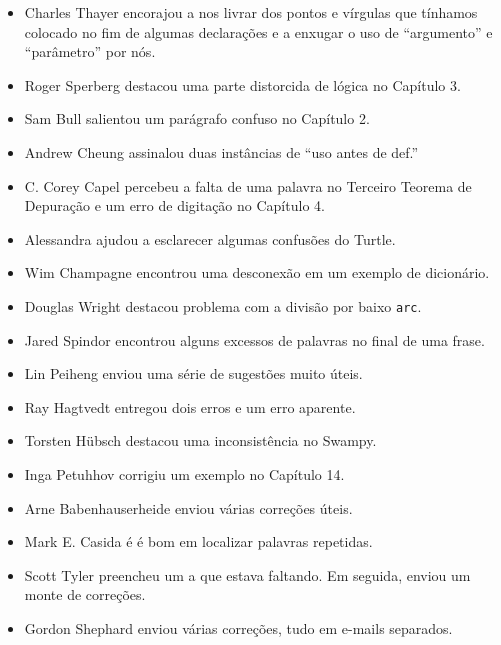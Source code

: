 \documentclass[10pt]{book}
\begin{document}
\begin {itemize}
\item Charles Thayer encorajou a nos livrar dos pontos e vírgulas
que tínhamos colocado no fim de algumas declarações e a enxugar o
uso de ``argumento'' e ``parâmetro'' por nós.

\item Roger Sperberg destacou uma parte distorcida de lógica no Capítulo 3.

\item Sam Bull salientou um parágrafo confuso no Capítulo 2.

\item Andrew Cheung assinalou duas instâncias de ``uso antes de def.''

\item C. Corey Capel percebeu a falta de uma palavra no Terceiro Teorema
de Depuração e um erro de digitação no Capítulo 4.

\item Alessandra ajudou a esclarecer algumas confusões do Turtle.

\item Wim Champagne encontrou uma desconexão em um exemplo de dicionário.

\item Douglas Wright destacou problema com a divisão por baixo
{\tt arc}.

\item Jared Spindor encontrou alguns excessos de palavras no final de uma frase.

\item Lin Peiheng enviou uma série de sugestões muito úteis.

\item Ray Hagtvedt entregou dois erros e um erro aparente.

\item Torsten H\"{u}bsch destacou uma inconsistência no Swampy.

\item Inga Petuhhov corrigiu um exemplo no Capítulo 14.

\item Arne Babenhauserheide enviou várias correções úteis.

\item Mark E. Casida é é bom em localizar palavras repetidas.

\item Scott Tyler preencheu um a que estava faltando. Em seguida, enviou
um monte de correções.

\item Gordon Shephard enviou várias correções, tudo em e-mails
separados.


\end{itemize}
\end{document}
